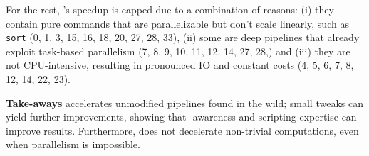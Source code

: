 \documentclass[letterpaper,twocolumn,10pt]{article}
\newcommand{\heading}[1]{\vspace{4pt}\noindent\textbf{#1}\enspace}
\newcommand{\ttt}[1]{\texttt{#1}}
\newcommand{\kk}[1]{[{\color{magenta}kk: #1}]}
\begin{document}
For the rest, \sys's speedup is capped due to a combination of reasons:
  (i) they contain pure commands that are parallelizable but don't scale linearly, such as \ttt{sort} (0, 1, 3, 15, 16, 18, 20, 27, 28, 33),
  (ii) some are deep pipelines that already exploit task-based parallelism (7, 8, 9, 10, 11, 12, 14, 27, 28,) and
  (iii) they are not CPU-intensive, resulting in pronounced IO and constant costs (4, 5, 6, 7, 8, 12, 14, 22, 23).








\heading{Take-aways} \sys accelerates unmodified pipelines found in the wild;
  small tweaks can yield further improvements, showing that \sys-awareness and scripting expertise can improve results.
Furthermore, \sys does not decelerate non-trivial computations, even when parallelism is impossible.
\end{document}
